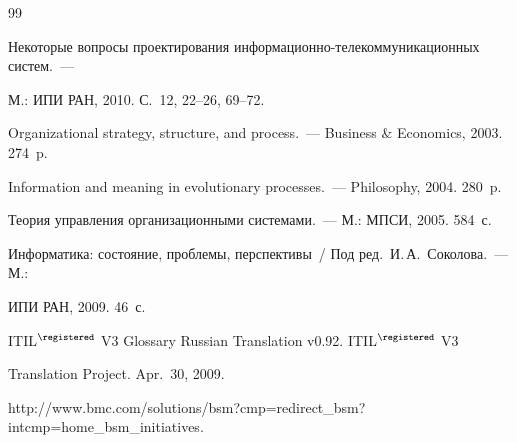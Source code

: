 {\small\frenchspacing


{%




\begin{thebibliography}{99}


         






Некоторые вопросы проектирования информационно-телекоммуникационных систем.~--- 


М.: ИПИ РАН, 2010.  С.~12, 22--26, 69--72.









Organizational strategy, structure, and process.~---  Business \& Economics, 2003. 274~p.









Information and meaning in evolutionary processes.~--- Philosophy, 2004.  280~p.









Теория управления организационными системами.~--- М.: МПСИ, 2005.  584~с.







Информатика: состояние, проблемы, перспективы~/ Под ред.\ И.\,А.~Соколова.~--- М.: 


ИПИ РАН, 2009. 46~с.







ITIL$^\registered$ V3 Glossary Russian Translation v0.92. ITIL$^\registered$ V3 


Translation Project. Apr.~30, 2009.







{\sf http://www.bmc.com/solutions/bsm?cmp=redirect\_bsm?intcmp=home\_bsm\_\linebreak initiatives}.






\end{thebibliography}}}
